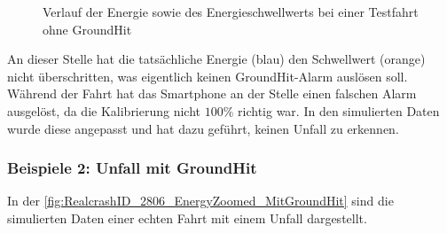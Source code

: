 \begin{figure}[H]
	\centering
	\caption{Verlauf der Energie sowie des Energieschwellwerts bei einer Testfahrt ohne GroundHit}
	\label{fig:GH_Testfahrt_noGroundHit_EnergyZoomed}
\end{figure}


An dieser Stelle hat die tatsächliche Energie (blau) den Schwellwert (orange) nicht überschritten, was eigentlich keinen GroundHit-Alarm auslösen soll. Während der Fahrt hat das Smartphone an der Stelle einen falschen Alarm ausgelöst, da die Kalibrierung nicht $100\%$ richtig war. In den simulierten Daten wurde diese angepasst und hat dazu geführt, keinen Unfall zu erkennen.

\subsubsection{Beispiele 2: Unfall mit GroundHit}
In der \autoref{fig:RealcrashID_2806_EnergyZoomed_MitGroundHit} sind die simulierten Daten einer echten Fahrt mit einem Unfall dargestellt. 

